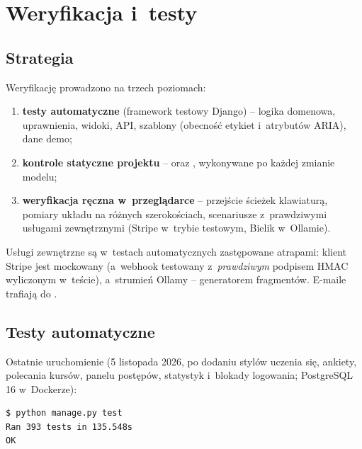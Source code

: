 \chapter{Weryfikacja i~testy}\label{ch:testy}

\section{Strategia}

Weryfikację prowadzono na trzech poziomach:
\begin{enumerate}
  \item \textbf{testy automatyczne} (framework testowy Django) -- logika domenowa,
        uprawnienia, widoki, API, szablony (obecność etykiet i~atrybutów ARIA), dane demo;
  \item \textbf{kontrole statyczne projektu} --  oraz
        , wykonywane po każdej zmianie modelu;
  \item \textbf{weryfikacja ręczna w~przeglądarce} -- przejście ścieżek klawiaturą,
        pomiary układu na różnych szerokościach, scenariusze z~prawdziwymi usługami
        zewnętrznymi (Stripe w~trybie testowym, Bielik w~Ollamie).
\end{enumerate}

Usługi zewnętrzne są w~testach automatycznych zastępowane atrapami: klient Stripe jest
mockowany (a~webhook testowany z~\emph{prawdziwym} podpisem HMAC wyliczonym w~teście),
a~strumień Ollamy -- generatorem fragmentów. E-maile trafiają do .

\section{Testy automatyczne}

Ostatnie uruchomienie (5 listopada 2026, po dodaniu stylów uczenia się, ankiety, polecania kursów, panelu postępów, statystyk i~blokady logowania; PostgreSQL 16 w~Dockerze):

\begin{lstlisting}
$ python manage.py test
Ran 393 tests in 135.548s
OK
\end{lstlisting}

